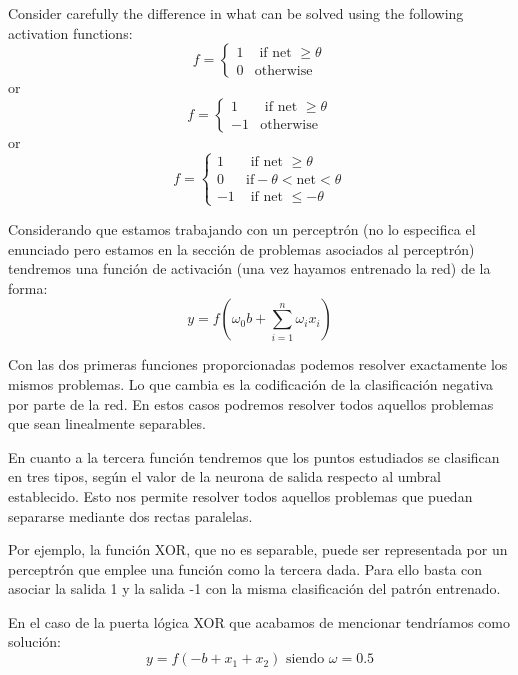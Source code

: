 \begin{problem}[12]
 Consider carefully the difference in what can be solved using the following activation
functions:
\[f=\left\{ \begin{array}{ll}1 & \text{ if net } \geq \theta \\ 0 & \text{otherwise} \end{array}\right.\]
or
\[f=\left\{ \begin{array}{ll}1 & \text{ if net } \geq \theta \\ -1 & \text{otherwise} \end{array}\right.\]
or
\[f=\left\{ \begin{array}{ll}1 & \text{ if net } \geq \theta \\ 0 & \text{if} -\theta < \text{net} < \theta \\ -1 & \text{ if net } \leq -\theta\end{array}\right.\]
\solution

Considerando que estamos trabajando con un perceptrón (no lo especifica el enunciado pero estamos en la sección de problemas asociados al perceptrón) tendremos una función de activación (una vez hayamos entrenado la red) de la forma:
\[y = f(ω_0b + \sum_{i=1}^nω_ix_i) \]

Con las dos primeras funciones proporcionadas podemos resolver exactamente los mismos problemas. Lo que cambia es la codificación de la clasificación negativa por parte de la red. En estos casos podremos resolver todos aquellos problemas que sean linealmente separables.

En cuanto a la tercera función tendremos que los puntos estudiados se clasifican en tres tipos, según el valor de la neurona de salida respecto al umbral establecido. Esto nos permite resolver todos aquellos problemas que puedan separarse mediante dos rectas paralelas.

Por ejemplo, la función XOR, que no es separable, puede ser representada por un perceptrón que emplee una función como la tercera dada. Para ello basta con asociar la salida 1 y la salida -1 con la misma clasificación del patrón entrenado.

En el caso de la puerta lógica XOR que acabamos de mencionar tendríamos como solución:
\[y=f(-b + x_1+x_2) \text{ siendo } ω =0.5\]

\end{problem}

